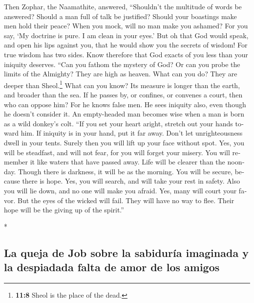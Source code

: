 \begin{paracol}{2}
\begin{otherlanguage}{english}
 Then Zophar, the Naamathite, answered, 
``Shouldn't the multitude of words be answered? Should a man full of
talk be justified?  Should your boastings make men hold
their peace? When you mock, will no man make you ashamed? 
For you say, `My doctrine is pure. I am clean in your eyes.'
 But oh that God would speak, and open his lips against
you,  that he would show you the secrets of wisdom! For
true wisdom has two sides. Know therefore that God exacts of you less
than your iniquity deserves.  ``Can you fathom the mystery
of God? Or can you probe the limits of the Almighty?  They
are high as heaven. What can you do? They are deeper than
Sheol.\footnote{\textbf{11:8} Sheol is the place of the dead.} What can
you know?  Its measure is longer than the earth, and
broader than the sea.  If he passes by, or confines, or
convenes a court, then who can oppose him?  For he knows
false men. He sees iniquity also, even though he doesn't consider it.
 An empty-headed man becomes wise when a man is born as a
wild donkey's colt.  ``If you set your heart aright,
stretch out your hands toward him.  If iniquity is in
your hand, put it far away. Don't let unrighteousness dwell in your
tents.  Surely then you will lift up your face without
spot. Yes, you will be steadfast, and will not fear,  for
you will forget your misery. You will remember it like waters that have
passed away.  Life will be clearer than the noonday.
Though there is darkness, it will be as the morning.  You
will be secure, because there is hope. Yes, you will search, and will
take your rest in safety.  Also you will lie down, and no
one will make you afraid. Yes, many will court your favor.
 But the eyes of the wicked will fail. They will have no
way to flee. Their hope will be the giving up of the spirit.''

\end{otherlanguage}

\switchcolumn[0]*

\hypertarget{la-queja-de-job-sobre-la-sabiduruxeda-imaginada-y-la-despiadada-falta-de-amor-de-los-amigos}{%
\subsection{La queja de Job sobre la sabiduría imaginada y la despiadada
falta de amor de los
amigos}\label{la-queja-de-job-sobre-la-sabiduruxeda-imaginada-y-la-despiadada-falta-de-amor-de-los-amigos}}


\end{paracol}
